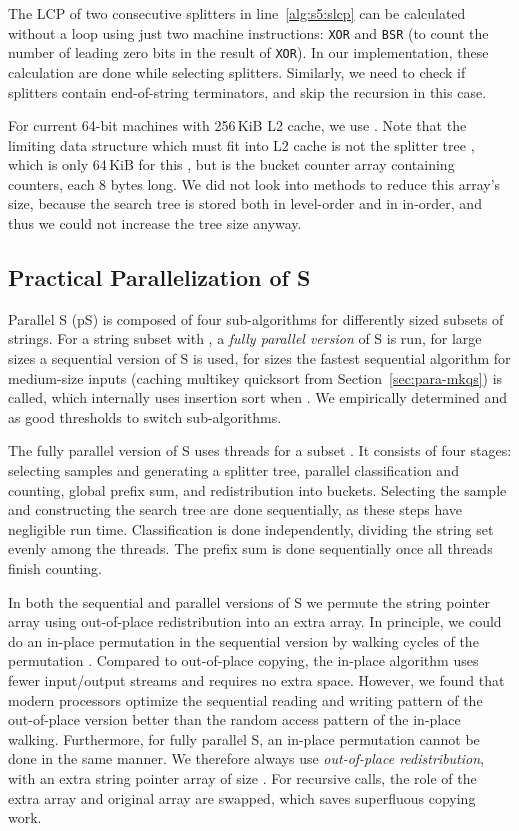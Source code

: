 \documentclass[a4paper]{myjournal}
\begin{document}
The LCP of two consecutive splitters in line~\ref{alg:s5:slcp} can be calculated
without a loop using just two machine instructions: \texttt{XOR} and
\texttt{BSR} (to count the number of leading zero bits in the result of
\texttt{XOR}). In our implementation, these calculation are done while selecting
splitters. Similarly, we need to check if splitters contain end-of-string
terminators, and skip the recursion in this case.

For current 64-bit machines with 256\,KiB L2 cache, we use . Note that
the limiting data structure which must fit into L2 cache is not the splitter
tree , which is only 64\,KiB for this , but is the bucket counter array
 containing  counters, each 8 bytes long. We did not look into methods
to reduce this array's size, because the search tree is stored both in
level-order and in in-order, and thus we could not increase the tree size
anyway.

\subsection{Practical Parallelization of \texorpdfstring{S}{S5}}\label{sec:parallel-s5}

Parallel S (pS) is composed of four sub-algorithms for differently sized
subsets of strings. For a string subset  with , a \emph{fully parallel version} of S is run, for large sizes
 a sequential version of S is used, for
sizes  the fastest sequential algorithm for
medium-size inputs (caching multikey quicksort from Section~\ref{sec:para-mkqs})
is called, which internally uses insertion sort when .  We
empirically determined  and  as good thresholds to
switch sub-algorithms.

The fully parallel version of S uses 
threads for a subset . It consists of four stages: selecting samples
and generating a splitter tree, parallel classification and counting, global
prefix sum, and redistribution into buckets. Selecting the sample and
constructing the search tree are done sequentially, as these steps have
negligible run time. Classification is done independently, dividing the string
set evenly among the  threads. The prefix sum is done sequentially once all
threads finish counting.

In both the sequential and parallel versions of S we permute the string
pointer array using out-of-place redistribution into an extra array. In
principle, we could do an in-place permutation in the sequential version by
walking cycles of the permutation \cite{mcilroy1993engineering}. Compared to
out-of-place copying, the in-place algorithm uses fewer input/output streams and
requires no extra space. However, we found that modern processors optimize the
sequential reading and writing pattern of the out-of-place version better than
the random access pattern of the in-place walking. Furthermore, for fully
parallel S, an in-place permutation cannot be done in the same manner.  We
therefore always use \emph{out-of-place redistribution}, with an extra string
pointer array of size . For recursive calls, the role of the extra array and
original array are swapped, which saves superfluous copying work.
\end{document}
